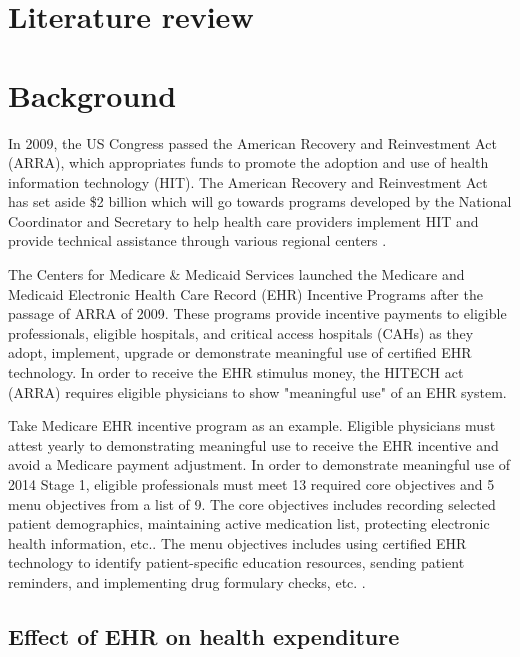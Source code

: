 \section{Literature review}

\section{Background}

In 2009, the US Congress passed the American Recovery and Reinvestment Act (ARRA), which appropriates funds to promote the adoption and use of health information technology (HIT). The American Recovery and Reinvestment Act has set aside \$2 billion which will go towards programs developed by the National Coordinator and Secretary to help health care providers implement HIT and provide technical assistance through various regional centers \citep{hhs_recovery}.

The Centers for Medicare \& Medicaid Services launched the Medicare and Medicaid Electronic Health Care Record (EHR) Incentive Programs after the passage of ARRA of 2009. These programs provide incentive payments to eligible professionals, eligible hospitals, and critical access hospitals (CAHs) as they adopt, implement, upgrade or demonstrate meaningful use of certified EHR technology. In order to receive the EHR stimulus money, the HITECH act (ARRA) requires eligible physicians to show "meaningful use" of an EHR system.

Take Medicare EHR incentive program as an example. Eligible physicians must attest yearly to demonstrating meaningful use to receive the EHR incentive and avoid a Medicare payment adjustment. In order to demonstrate meaningful use of 2014 Stage 1, eligible professionals must meet 13 required core objectives and 5 menu objectives from a list of 9. The core objectives includes recording selected patient demographics, maintaining active medication list, protecting electronic health information, etc.. The menu objectives includes using certified EHR technology to identify patient-specific education resources, sending patient reminders, and implementing drug formulary checks, etc. \citep{stage1}.

\subsection{Effect of EHR on health expenditure}

